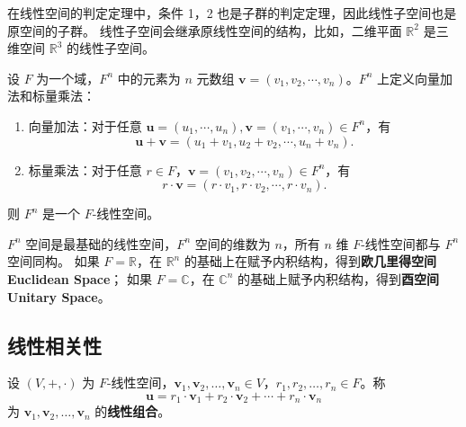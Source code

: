 \begin{note}
    在线性空间的判定定理中，条件 1，2 也是子群的判定定理，因此线性子空间也是原空间的子群。
    线性子空间会继承原线性空间的结构，比如，二维平面 $ \mathbb{R}^2 $ 是三维空间 $ \mathbb{R}^3 $ 的线性子空间。
\end{note}

\vspace{1em}

\begin{definition}[$F^n$ 空间]
    设 $F$ 为一个域，$F^n$ 中的元素为 $n$ 元数组 $\mathbf{v}=(v_1,v_2,\cdots,v_n)$。$F^n$ 上定义向量加法和标量乘法：
    \begin{enumerate}
        \item 向量加法：对于任意 $\mathbf{u}=(u_1,\cdots,u_n),\mathbf{v}=(v_1,\cdots,v_n)\in F^n$，有
        \[
            \mathbf{u}+\mathbf{v}=(u_1+v_1,u_2+v_2,\cdots,u_n+v_n).
        \]
        \item 标量乘法：对于任意 $r\in F$，$\mathbf{v}=(v_1,v_2,\cdots,v_n)\in F^n$，有
        \[
            r\cdot \mathbf{v} = (r\cdot v_1,r\cdot v_2,\cdots,r\cdot v_n).
        \]
    \end{enumerate}
    则 $F^n$ 是一个 $F$-线性空间。
    \label{def:Fn_space}
\end{definition}

\begin{note}
    $F^n$ 空间是最基础的线性空间，$F^n$ 空间的维数为 $n$，所有 $n$ 维 $F$-线性空间都与 $F^n$ 空间同构。
    如果 $F=\mathbb{R}$，在 $\mathbb{R}^n$ 的基础上在赋予内积结构，得到\textbf{欧几里得空间 Euclidean Space}；
    如果 $F=\mathbb{C}$，在 $\mathbb{C}^n$ 的基础上赋予内积结构，得到\textbf{酉空间 Unitary Space}。
\end{note}
\vspace{1em}

\subsection{线性相关性}

\begin{definition}[线性组合]
    设 $ (V,+,\cdot) $ 为 $ F $-线性空间，$ \mathbf{v}_1,\mathbf{v}_2,\ldots,\mathbf{v}_n\in V $，$ r_1,r_2,\ldots,r_n\in F $。称
    \[
        \mathbf{u} = r_1\cdot \mathbf{v}_1 + r_2\cdot \mathbf{v}_2 + \cdots + r_n\cdot \mathbf{v}_n
    \]
    为 $ \mathbf{v}_1,\mathbf{v}_2,\ldots,\mathbf{v}_n $ 的\textbf{线性组合}。
\end{definition}

